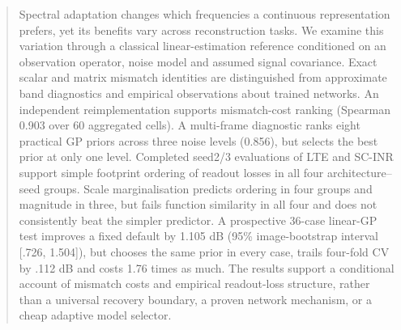 \begin{abstract}
Spectral adaptation changes which frequencies a continuous representation
prefers, yet its benefits vary across reconstruction tasks. We examine this
variation through a classical linear-estimation reference conditioned on an
observation operator, noise model and assumed signal covariance. Exact
scalar and matrix mismatch identities are distinguished from approximate
band diagnostics and empirical observations about trained networks.
An independent reimplementation supports mismatch-cost ranking (Spearman
0.903 over 60 aggregated cells). A multi-frame diagnostic ranks eight
practical GP priors across three noise levels (0.856), but selects the best
prior at only one level. Completed seed2/3 evaluations of LTE and SC-INR
support simple footprint ordering of readout losses in all four
architecture--seed groups. Scale marginalisation predicts ordering in four
groups and magnitude in three, but fails function similarity in all four
and does not consistently beat the simpler predictor. A prospective
36-case linear-GP test improves a fixed default by 1.105 dB
(95\% image-bootstrap interval [.726, 1.504]), but chooses the same prior
in every case, trails four-fold CV by .112 dB and costs 1.76 times as much.
The results support
a conditional account of mismatch costs and empirical readout-loss
structure, rather than a universal recovery boundary, a proven network
mechanism, or a cheap adaptive model selector.
\end{abstract}
